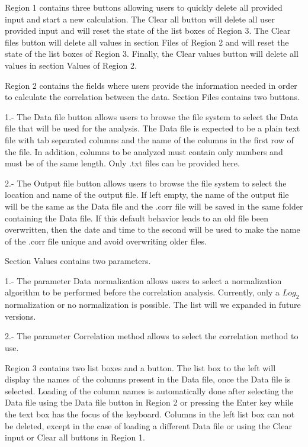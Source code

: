 Region \num{1} contains three buttons allowing users to quickly delete all provided input and start a new calculation. The Clear all button will delete all user provided input and will reset the state of the list boxes of Region \num{3}. The Clear files button will delete all values in section Files of Region \num{2} and will reset the state of the list boxes of Region \num{3}. Finally, the Clear values button will delete all values in section Values of Region \num{2}.

Region \num{2} contains the fields where users provide the information needed in order to calculate the correlation between the data. Section Files contains two buttons.

\num{1}.- The Data file button allows users to browse the file system to select the Data file that will be used for the analysis. The Data file is expected to be a plain text file with tab separated columns and the name of the columns in the first row of the file. In addition, columns to be analyzed must contain only numbers and must be of the same length. Only .txt files can be provided here. 

\num{2}.- The Output file button allows users to browse the file system to select the location and name of the output file. If left empty, the name of the output file will be the same as the Data file and the .corr file will be saved in the same folder containing the Data file. If this default behavior leads to an old file been overwritten, then the date and time to the second will be used to make the name of the .corr file unique and avoid overwriting older files. 

Section Values contains two parameters.

\num{1}.- The parameter Data normalization allows users to select a normalization algorithm to be performed before the correlation analysis. Currently, only a $Log_{2}$ normalization or no normalization is possible. The list will we expanded in future versions. 

\num{2}.- The parameter Correlation method allows to select the correlation method to use.

Region \num{3} contains two list boxes and a button. The list box to the left will display the names of the columns present in the Data file, once the Data file is selected. Loading of the column names is automatically done after selecting the Data file using the Data file button in Region \num{2} or pressing the Enter key while the text box has the focus of the keyboard. Columns in the left list box can not be deleted, except in the case of loading a different Data file or using the Clear input or Clear all buttons in Region \num{1}. 

